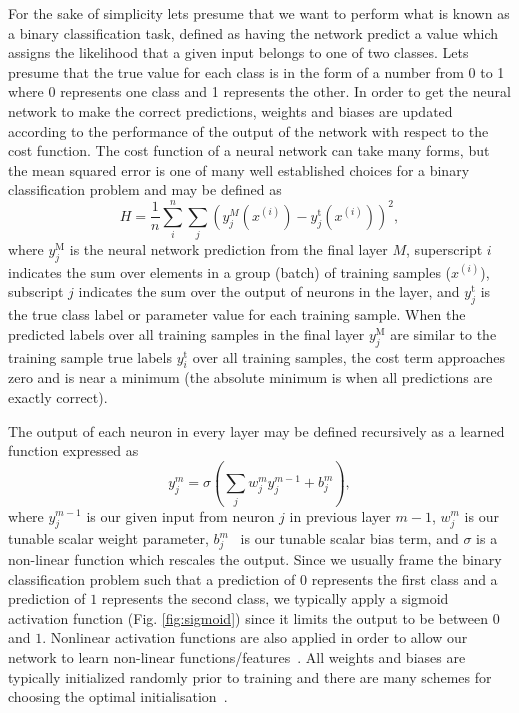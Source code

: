 For the sake of simplicity 
lets presume that we want to perform what is known as a binary classification 
task, defined as having the network predict a value 
which assigns the likelihood that 
a given input belongs to one of two classes. Lets presume that the true value 
for each class is 
in the form of a number from 
0 to 1 where 0 represents one class and 1 represents the other. In order to get 
the neural network to make the correct predictions, weights and biases are 
updated according to the performance 
of the output of the network with respect to the cost function.
The cost function of a neural network can take many forms, 
but the mean squared error is one of many well established choices for a 
binary classification problem and may be defined as
%
\begin{equation}\label{eq:mean_squared_error}
    H = \frac{1}{n}\sum_{i}^{n}\sum_{j}\left(y^{M}_j(x^{(i)}) - y_{j}^{\mathrm{t}}(x^{(i)})\right)^2,
\end{equation}
%
%
where $y^{\mathrm{M}}_j$ is the neural network prediction from the final 
layer $M$, superscript $i$ indicates the sum over elements in 
a group (batch) of training samples ($x^{(i)}$), subscript $j$ indicates 
the sum over the output of neurons in the layer,
and $y^{\mathrm{t}}_j$ is the true class label or parameter value for 
each training sample. When 
the predicted labels over all training samples in the 
final layer $y^{\mathrm{M}}_j$ are 
similar to the training sample true labels $y^{\mathrm{t}}_i$ over 
all training samples, the cost term approaches 
zero and is near a minimum (the absolute minimum is when all predictions 
are exactly correct).

The output of each neuron in every layer may be 
defined recursively as a learned function expressed as
%
\begin{equation}\label{eq:recur_neurons}
    y^{m}_j = \sigma\left(\sum_{j}w^{m}_{j}y^{m-1}_j + b^{m}_{j}\right),
\end{equation}
%
%
where $y^{m-1}_j$ is our given input from neuron $j$ in previous layer 
$m-1$, $w^{m}_{j}$ is our tunable scalar weight parameter, 
$b^{m}_{j}$~ 
 is our tunable scalar 
bias term, and $\sigma$ is a non-linear function which 
rescales the output. Since we usually frame the binary classification problem such that a prediction 
of $0$ represents the first class and a prediction of $1$ 
represents the second class, we typically 
apply a sigmoid activation function (Fig. \ref{fig:sigmoid}) 
since it limits the output to be 
between $0$ and $1$. Nonlinear activation functions are 
also applied in order to allow 
our network to learn 
non-linear functions/features~\cite{1811.03378}. All weights 
and biases are typically 
initialized randomly prior to training and there are many 
schemes for choosing the 
optimal initialisation~\cite{1704.08863}.

